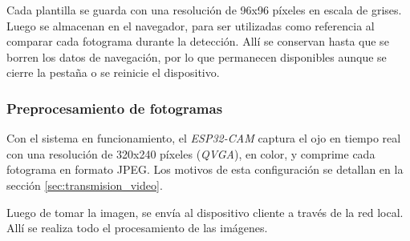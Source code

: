 Cada plantilla se guarda con una resolución de 96x96 píxeles en escala de grises. Luego se almacenan en el navegador, para ser utilizadas como referencia al comparar cada fotograma durante la detección. Allí se conservan hasta que se borren los datos de navegación, por lo que permanecen disponibles aunque se cierre la pestaña o se reinicie el dispositivo. 

\subsubsection{Preprocesamiento de fotogramas}

Con el sistema en funcionamiento, el \emph{ESP32-CAM} captura el ojo en tiempo real con una resolución de 320x240 píxeles (\emph{QVGA}), en color, y comprime cada fotograma en formato JPEG. Los motivos de esta configuración se detallan en la sección \ref{sec:transmision_video}.



Luego de tomar la imagen, se envía al dispositivo cliente a través de la red local. Allí se realiza todo el procesamiento de las imágenes.

